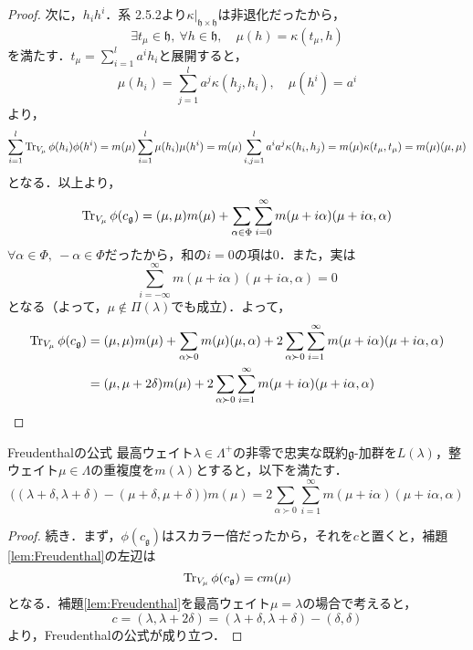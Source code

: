 \documentclass[rep_main]{subfiles}
\begin{document}
\begin{proof}
	次に，$h_ih^i$．系 2.5.2より$\kappa|_{\mathfrak{h}\times\mathfrak{h}}$は非退化だったから，
	\begin{equation}
		\exists t_\mu \in \mathfrak{h},\ \forall h \in \mathfrak{h},\quad  \mu(h) = \kappa(t_\mu, h)
	\end{equation}
	を満たす．$t_\mu = \sum_{i=1}^l a^ih_i$と展開すると，
	\begin{equation}
		\mu(h_i) = \sum_{j=1}^l a^j\kappa(h_j, h_i),\quad  \mu(h^i) = a^i
	\end{equation}
	より，
	\begin{equation}
		\sum_{i=1}^l\Tr_{V_\mu} \phi(h_i)\phi(h^i) = m(\mu)\sum_{i=1}^l\mu(h_i)\mu(h^i) = m(\mu)\sum_{i,j=1}^l a^ia^j\kappa(h_i, h_j) = m(\mu)\kappa(t_\mu, t_\mu) = m(\mu)(\mu, \mu)
	\end{equation}
	となる．以上より，
	\begin{equation}
		\Tr_{V_\mu} \phi(c_\mathfrak{g}) = (\mu, \mu)m(\mu) + \sum_{\alpha \in \Phi} \sum_{i=0}^\infty m(\mu + i\alpha)(\mu + i\alpha, \alpha)
	\end{equation}
	$\forall \alpha \in \Phi,\ -\alpha \in \Phi$だったから，和の$i = 0$の項は$0$．また，実は
	\begin{equation}
		\sum_{i=-\infty}^\infty m(\mu + i\alpha)(\mu + i\alpha, \alpha) = 0
	\end{equation}
	となる（よって，$\mu \notin \Pi(\lambda)$でも成立）．よって，
	\begin{align}
		\Tr_{V_\mu} \phi(c_\mathfrak{g}) &= (\mu, \mu)m(\mu) + \sum_{\alpha \succ 0} m(\mu)(\mu, \alpha) + 2\sum_{\alpha \succ 0} \sum_{i=1}^\infty m(\mu + i\alpha)(\mu + i\alpha, \alpha) \\
		&= (\mu, \mu + 2\delta)m(\mu) + 2\sum_{\alpha \succ 0} \sum_{i=1}^\infty m(\mu + i\alpha)(\mu + i\alpha, \alpha)
	\end{align}
\end{proof}

\begin{mytheo}[label=thm:Freudenthal]{Freudenthalの公式}
	最高ウェイト$\lambda \in \Lambda^+$の非零で忠実な既約$\mathfrak{g}$-加群を$L(\lambda)$，整ウェイト$\mu \in \Lambda$の重複度を$m(\lambda)$とすると，以下を満たす．
	\begin{equation}
		\big((\lambda + \delta, \lambda + \delta) - (\mu + \delta, \mu + \delta)\big)m(\mu) = 2\sum_{\alpha \succ 0}\sum_{i=1}^\infty m(\mu + i\alpha)(\mu + i\alpha, \alpha)
	\end{equation}
\end{mytheo}
\begin{proof}
	続き．まず，$\phi(c_\mathfrak{g})$はスカラー倍だったから，それを$c$と置くと，補題\ref{lem:Freudenthal}の左辺は
	\begin{equation}
		\Tr_{V_\mu} \phi(c_\mathfrak{g}) = cm(\mu)
	\end{equation}
	となる．補題\ref{lem:Freudenthal}を最高ウェイト$\mu = \lambda$の場合で考えると，
	\begin{equation}
		c = (\lambda, \lambda + 2\delta) = (\lambda + \delta, \lambda + \delta) - (\delta, \delta)
	\end{equation}
	より，Freudenthalの公式が成り立つ．
\end{proof}
\end{document}
